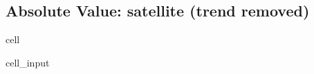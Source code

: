 \documentclass[letterpaper,10pt,english]{jupyterBook}
\begin{document}
\subsection{Absolute Value: satellite (trend removed)}
\label{\detokenize{notebooks/regional_and_local/SL_anomaly_intra-annual:absolute-value-satellite-trend-removed}}
\begin{sphinxuseclass}{cell}\begin{sphinxVerbatimInput}

\begin{sphinxuseclass}{cell_input}
\begin{sphinxVerbatim}[commandchars=\\\{\}]
    
\end{sphinxVerbatim}

\end{sphinxuseclass}\end{sphinxVerbatimInput}

\end{sphinxuseclass}
\end{document}
